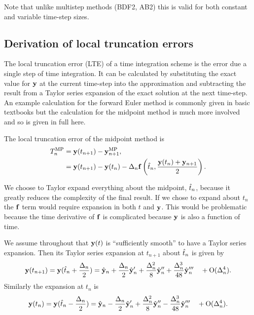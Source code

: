 Note that unlike multistep methods (\eg BDF2, AB2) this is valid for both constant and variable time-step sizes.


\subsection{Derivation of local truncation errors}

The local truncation error (LTE) of a time integration scheme is the error due a single step of time integration.
It can be calculated by substituting the exact value for $\mathbf{y}$ at the current time-step into the approximation and subtracting the result from a Taylor series expansion of the exact solution at the next time-step.
An example calculation for the forward Euler method is commonly given in basic textbooks but the calculation for the midpoint method is much more involved and so is given in full here.

The local truncation error of the midpoint method is
\begin{align}
  T_n^{\text{MP}} &= \mathbf{y}(t_{n+1}) - \mathbf{y}_{n+1}^{\text{MP}}, \notag\\
  &= \mathbf{y}(t_{n+1}) - \mathbf{y}(t_n) - \Delta_{n} {\mathbf{f}}\left( \hat{t}_{n}, \frac{\mathbf{y}(t_n) + \mathbf{y}_{n+1}}{2} \right).
  \label{eq:trunc-start}
\end{align}

We choose to Taylor expand everything about the midpoint, $\hat{t}_{n}$, because it greatly reduces the complexity of the final result.
If we chose to expand about $t_n$ the ${\mathbf{f}}$ term would require expansion in both $t$ and $\mathbf{y}$.
This would be problematic because the time derivative of ${\mathbf{f}}$ is complicated because $\mathbf{y}$ is also a function of time.

We assume throughout that $\mathbf{y}(t)$ is ``sufficiently smooth'' to have a Taylor series expansion. Then its Taylor series expansion at $t_{n+1}$ about $\hat{t}_{n}$ is given by
\begin{equation}
  \mathbf{y}(t_{n+1}) = \mathbf{y}(\hat{t}_{n} + \frac{\Delta_{n}}{2}) = \hat{\mathbf{y}}_{n} + \frac{\Delta_{n}}{2} \hat{\mathbf{y}}_{n}' + \frac{\Delta_{n}^2}{8} \hat{\mathbf{y}}_{n}'' + \frac{\Delta_{n}^3}{48} \hat{\mathbf{y}}_{n}''' \quad + \text{O}(\Delta_{n}^4).
  \label{eq:taylornp1}
\end{equation}
Similarly the expansion at $t_n$ is
\begin{equation}
  \mathbf{y}(t_n) = \mathbf{y}(\hat{t}_{n} - \frac{\Delta_{n}}{2}) = \hat{\mathbf{y}}_{n} - \frac{\Delta_{n}}{2} \hat{\mathbf{y}}_{n}' + \frac{\Delta_{n}^2}{8} \hat{\mathbf{y}}_{n}'' - \frac{\Delta_{n}^3}{48} \hat{\mathbf{y}}_{n}''' \quad + \text{O}(\Delta_{n}^4).
  \label{eq:taylorn}
\end{equation}

